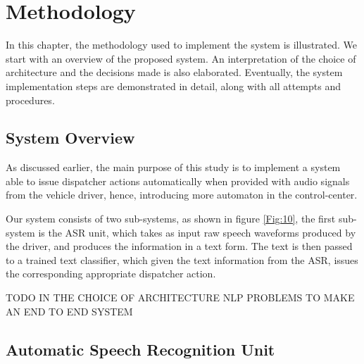\chapter{Methodology}
\label{chap:methodology}

 \hypersetup{
	colorlinks=false,
	linkcolor=black,
	filecolor=black,
	citecolor = blue,      
	urlcolor=cyan,
}

In this chapter, the methodology used to implement the system is illustrated. We start with an overview of the proposed system. An interpretation of the choice of architecture and the decisions made is also elaborated. Eventually, the system implementation steps are demonstrated in detail, along with all attempts and procedures.




\section{System Overview} 
\label{meth:s1}

As discussed earlier, the main purpose of this study is to implement a system able to issue dispatcher actions automatically when provided with audio signals from the vehicle driver, hence, introducing more automaton in the control-center. 

Our system consists of two sub-systems, as shown in figure \ref{Fig:10}, the first sub-system is the \ac{ASR} unit, which takes as input raw speech waveforms produced by the driver, and produces the information in a text form. The text is then passed to a trained text classifier, which given the text information from the \ac{ASR}, issues the corresponding appropriate dispatcher action.

TODO IN THE CHOICE OF ARCHITECTURE NLP PROBLEMS TO MAKE AN END TO END SYSTEM

\section{Automatic Speech Recognition Unit} 
\label{meth:s2}

